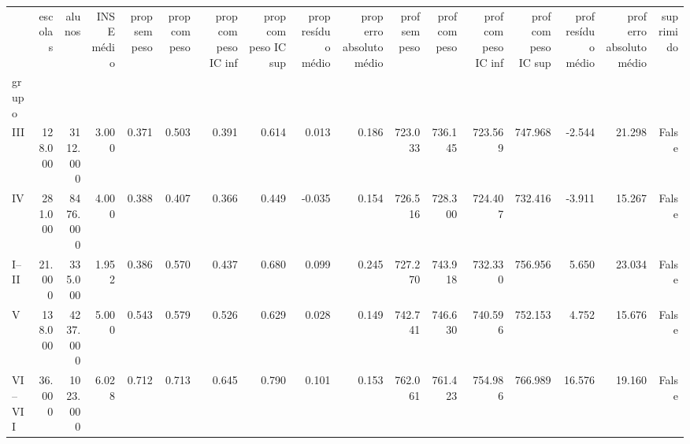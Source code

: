 \begin{tabular}{lrrrrrrrrrrrrrrrr}
\toprule
 & escolas & alunos & INSE médio & prop sem peso & prop com peso & prop com peso IC inf & prop com peso IC sup & prop resíduo médio & prop erro absoluto médio & prof sem peso & prof com peso & prof com peso IC inf & prof com peso IC sup & prof resíduo médio & prof erro absoluto médio & suprimido \\
grupo &  &  &  &  &  &  &  &  &  &  &  &  &  &  &  &  \\
\midrule
III & 128.000 & 3112.000 & 3.000 & 0.371 & 0.503 & 0.391 & 0.614 & 0.013 & 0.186 & 723.033 & 736.145 & 723.569 & 747.968 & -2.544 & 21.298 & False \\
IV & 281.000 & 8476.000 & 4.000 & 0.388 & 0.407 & 0.366 & 0.449 & -0.035 & 0.154 & 726.516 & 728.300 & 724.407 & 732.416 & -3.911 & 15.267 & False \\
I–II & 21.000 & 335.000 & 1.952 & 0.386 & 0.570 & 0.437 & 0.680 & 0.099 & 0.245 & 727.270 & 743.918 & 732.330 & 756.956 & 5.650 & 23.034 & False \\
V & 138.000 & 4237.000 & 5.000 & 0.543 & 0.579 & 0.526 & 0.629 & 0.028 & 0.149 & 742.741 & 746.630 & 740.596 & 752.153 & 4.752 & 15.676 & False \\
VI–VII & 36.000 & 1023.000 & 6.028 & 0.712 & 0.713 & 0.645 & 0.790 & 0.101 & 0.153 & 762.061 & 761.423 & 754.986 & 766.989 & 16.576 & 19.160 & False \\
\bottomrule
\end{tabular}
